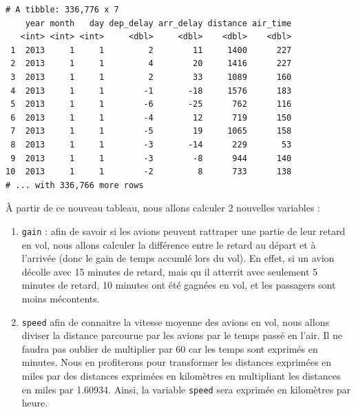 \documentclass[
  a4paper,
]{article}
\newenvironment{Shaded}{\begin{snugshade}}{\end{snugshade}}
\newcommand{\DataTypeTok}[1]{\textcolor[rgb]{0.00,0.34,0.68}{#1}}
\newcommand{\DecValTok}[1]{\textcolor[rgb]{0.69,0.50,0.00}{#1}}
\newcommand{\FloatTok}[1]{\textcolor[rgb]{0.69,0.50,0.00}{#1}}
\newcommand{\KeywordTok}[1]{\textcolor[rgb]{0.12,0.11,0.11}{\textbf{#1}}}
\newcommand{\NormalTok}[1]{\textcolor[rgb]{0.12,0.11,0.11}{#1}}
\newcommand{\OperatorTok}[1]{\textcolor[rgb]{0.12,0.11,0.11}{#1}}
\newcommand{\StringTok}[1]{\textcolor[rgb]{0.75,0.01,0.01}{#1}}
\providecommand{\tightlist}{%
  \setlength{\itemsep}{0pt}\setlength{\parskip}{0pt}}
\begin{document}
\begin{verbatim}
# A tibble: 336,776 x 7
    year month   day dep_delay arr_delay distance air_time
   <int> <int> <int>     <dbl>     <dbl>    <dbl>    <dbl>
 1  2013     1     1         2        11     1400      227
 2  2013     1     1         4        20     1416      227
 3  2013     1     1         2        33     1089      160
 4  2013     1     1        -1       -18     1576      183
 5  2013     1     1        -6       -25      762      116
 6  2013     1     1        -4        12      719      150
 7  2013     1     1        -5        19     1065      158
 8  2013     1     1        -3       -14      229       53
 9  2013     1     1        -3        -8      944      140
10  2013     1     1        -2         8      733      138
# ... with 336,766 more rows
\end{verbatim}

À partir de ce nouveau tableau, nous allons calculer 2 nouvelles variables :

\begin{enumerate}
\def\labelenumi{\arabic{enumi}.}
\tightlist
\item
  \texttt{gain} : afin de savoir si les avions peuvent rattraper une partie de leur retard en vol, nous allons calculer la différence entre le retard au départ et à l'arrivée (donc le gain de temps accumlé lors du vol). En effet, si un avion décolle avec 15 minutes de retard, mais qu
  il atterrit avec seulement 5 minutes de retard, 10 minutes ont été gagnées en vol, et les passagers sont moins mécontents.
\item
  \texttt{speed} afin de connaitre la vitesse moyenne des avions en vol, nous allons diviser la distance parcourue par les avions par le temps passé en l'air. Il ne faudra pas oublier de multiplier par 60 car les temps sont exprimés en minutes. Nous en profiterons pour transformer les distances exprimées en miles par des distances exprimées en kilomètres en multipliant les distances en miles par 1.60934. Ainsi, la variable \texttt{speed} sera exprimée en kilomètres par heure.
\end{enumerate}

\begin{Shaded}
\end{Shaded}
\end{document}
